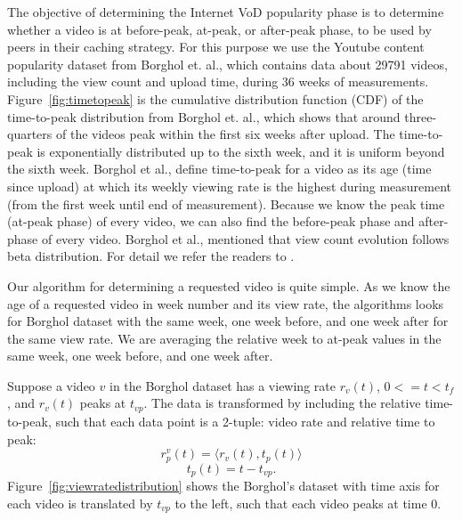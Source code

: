 \documentclass[10pt,final,journal,a4paper]{IEEEtran}
\begin{document}
The objective of determining the Internet VoD popularity phase is to determine whether a video is at before-peak, at-peak, or after-peak phase, to be used by peers in their caching strategy.
For this purpose we use the Youtube content popularity dataset from Borghol et. al.,\cite{Borghol:2011:CMP:2039452.2039717}  which contains data about 29791 videos, including the view count and upload time, during 36 weeks of measurements.
Figure~\ref{fig:timetopeak} is the cumulative distribution function (CDF) of the time-to-peak distribution from Borghol et. al.,\cite{Borghol:2011:CMP:2039452.2039717}  which shows that around three-quarters of the videos peak within the first six weeks after upload.
The time-to-peak is exponentially distributed up to the sixth week, and it is uniform beyond the sixth week.
Borghol et al., \cite{Borghol:2011:CMP:2039452.2039717} define time-to-peak for a video as its age (time since upload) at which its weekly viewing rate is the highest during measurement (from the first week until end of measurement).
Because we know the peak time (at-peak phase) of every video, we can also find the before-peak phase and after-phase of every video. 
Borghol et al., \cite{Borghol:2011:CMP:2039452.2039717} mentioned that view count evolution follows beta distribution.
For detail we refer the readers to \cite{Borghol:2011:CMP:2039452.2039717}.

Our algorithm for determining a requested video is quite simple.  
As we know the age of a requested video in week number and its view rate, the algorithms looks for Borghol dataset with the same week, one week before, and one week after for the same view rate.  
We are averaging the relative week to at-peak values in the same week, one week before, and one week after. 

Suppose a video $v$ in the Borghol dataset has a viewing rate $r_v(t)$, $0 <= t < t_f$, and $r_v(t)$ peaks at $t_{vp}$.
The data is transformed by including the relative time-to-peak, such that each data point is a 2-tuple: video rate and relative time to peak:
\begin{equation}
\label{eq:rp}
r_p^v(t) = \langle r_v(t), t_p(t) \rangle
\end{equation}
\begin{equation}
\label{eq:tp}
t_p(t) = t - t_{vp}.
\end{equation}
Figure~\ref{fig:viewratedistribution} shows the Borghol's dataset with time axis for each video is translated by $t_{vp}$ to the left, such that each video peaks at time $0$.
\end{document}
